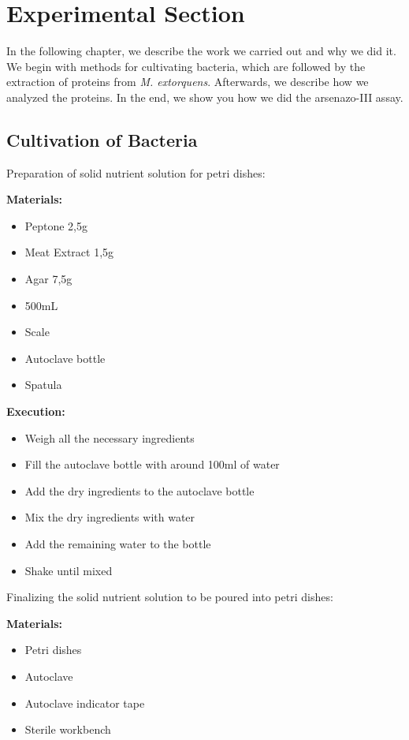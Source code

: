 \chapter{Experimental Section}

In the following chapter, we describe the work we carried out and why we did it.
We begin with methods for cultivating bacteria, which are followed by the extraction of proteins from \emph{M. extorquens}.
Afterwards, we describe how we analyzed the proteins.
In the end, we show you how we did the arsenazo-III assay.

\section{Cultivation of Bacteria\authorB}

Preparation of solid nutrient solution for petri dishes:

\textbf{Materials:}

\begin{itemize}
    \item Peptone 2,5g
    \item Meat Extract 1,5g
    \item Agar 7,5g
    \item {} 500mL
    \item Scale
    \item Autoclave bottle
    \item Spatula
\end{itemize}


\textbf{Execution:}
\begin{itemize}
    \item Weigh all the necessary ingredients
    \item Fill the autoclave bottle with around 100ml of water
    \item Add the dry ingredients to the autoclave bottle
    \item Mix the dry ingredients with water
    \item Add the remaining water to the bottle
    \item Shake until mixed
\end{itemize}


Finalizing the solid nutrient solution to be poured into petri dishes:

\textbf{Materials:}

\begin{itemize}
    \item Petri dishes
    \item Autoclave
    \item Autoclave indicator tape
    \item Sterile workbench
\end{itemize}


